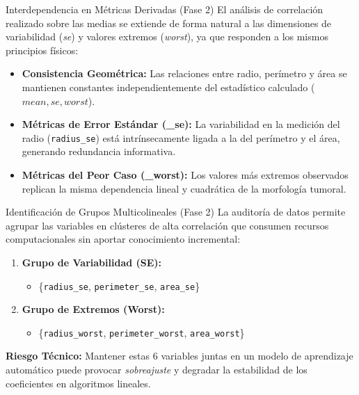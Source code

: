 \documentclass{beamer}
\begin{document}
	\begin{frame}{Interdependencia en Métricas Derivadas (Fase 2)}
		El análisis de correlación realizado sobre las medias se extiende de forma natural a las dimensiones de variabilidad (\textit{se}) y valores extremos (\textit{worst}), ya que responden a los mismos principios físicos:
		
		\begin{itemize}
			\item<2-> \textbf{Consistencia Geométrica:} Las relaciones entre radio, perímetro y área se mantienen constantes independientemente del estadístico calculado ($mean, se, worst$).
			\item<3-> \textbf{Métricas de Error Estándar (\_se):} La variabilidad en la medición del radio (\texttt{radius\_se}) está intrínsecamente ligada a la del perímetro y el área, generando redundancia informativa.
			\item<4-> \textbf{Métricas del Peor Caso (\_worst):} Los valores más extremos observados replican la misma dependencia lineal y cuadrática de la morfología tumoral.
		\end{itemize}
	\end{frame}
	
	\begin{frame}{Identificación de Grupos Multicolineales (Fase 2)}
		La auditoría de datos permite agrupar las variables en clústeres de alta correlación que consumen recursos computacionales sin aportar conocimiento incremental:
		
		\begin{enumerate}
			\item<2-> \textbf{Grupo de Variabilidad (SE):}
			\begin{itemize}
				\item \{\texttt{radius\_se}, \texttt{perimeter\_se}, \texttt{area\_se}\}
			\end{itemize}
			\item<3-> \textbf{Grupo de Extremos (Worst):}
			\begin{itemize}
				\item \{\texttt{radius\_worst}, \texttt{perimeter\_worst}, \texttt{area\_worst}\}
			\end{itemize}
		\end{enumerate}
		\textbf{Riesgo Técnico:} Mantener estas 6 variables juntas en un modelo de aprendizaje automático puede provocar \textit{sobreajuste} y degradar la estabilidad de los coeficientes en algoritmos lineales.
	\end{frame}
	
\end{document}
